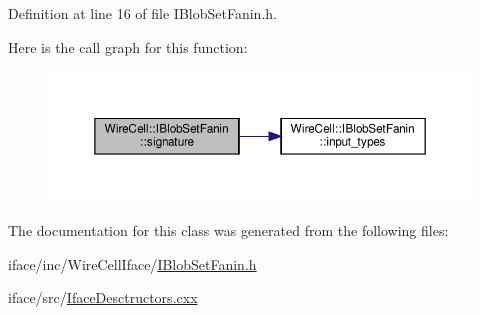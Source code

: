 Definition at line 16 of file I\+Blob\+Set\+Fanin.\+h.

Here is the call graph for this function\+:
\nopagebreak
\begin{figure}[H]
\begin{center}
\leavevmode
\includegraphics[width=350pt]{class_wire_cell_1_1_i_blob_set_fanin_a8649f2b27c10e56d730d47357caa36cc_cgraph}
\end{center}
\end{figure}


The documentation for this class was generated from the following files\+:\begin{DoxyCompactItemize}
\item 
iface/inc/\+Wire\+Cell\+Iface/\hyperlink{_i_blob_set_fanin_8h}{I\+Blob\+Set\+Fanin.\+h}\item 
iface/src/\hyperlink{_iface_desctructors_8cxx}{Iface\+Desctructors.\+cxx}\end{DoxyCompactItemize}
